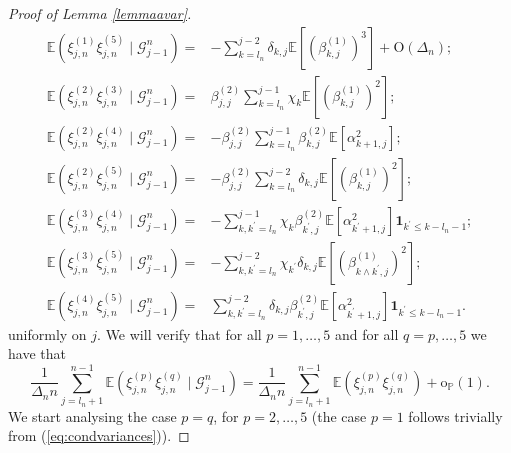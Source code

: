 \documentclass[10pt,a4paper]{amsart}
\begin{document}
\begin{proof}[Proof of Lemma \ref{lemmaavar}]
\begin{equation}
\begin{aligned}
			\mathbb{E}(\xi_{j,n}^{(1)}\xi_{j,n}^{(5)}\mid\mathscr{G}_{j-1}^{n})= &-\sum_{k=l_{n}}^{j-2}\delta_{k,j}\mathbb{E}[(\beta_{k,j}^{(1)})^{3}] +\mathrm{O}(\Delta_n);\\
			\mathbb{E}(\xi_{j,n}^{(2)}\xi_{j,n}^{(3)}\mid\mathscr{G}_{j-1}^{n})= & \beta_{j,j}^{(2)}\sum_{k=l_{n}}^{j-1}\chi_{k}\mathbb{E}[(\beta_{k,j}^{(1)})^{2}];\\
			\mathbb{E}(\xi_{j,n}^{(2)}\xi_{j,n}^{(4)}\mid\mathscr{G}_{j-1}^{n})= & -\beta_{j,j}^{(2)}\sum_{k=l_{n}}^{j-1}\beta_{k,j}^{(2)}\mathbb{E}[\alpha_{k+1,j}^{2}];\\
			\mathbb{E}(\xi_{j,n}^{(2)}\xi_{j,n}^{(5)}\mid\mathscr{G}_{j-1}^{n})= & -\beta_{j,j}^{(2)}\sum_{k=l_{n}}^{j-2}\delta_{k,j}\mathbb{E}[(\beta_{k,j}^{(1)})^{2}];\\
			\mathbb{E}(\xi_{j,n}^{(3)}\xi_{j,n}^{(4)}\mid\mathscr{G}_{j-1}^{n})= & -\sum_{k,k^{\prime}=l_{n}}^{j-1}\chi_{k}\beta_{k^{\prime},j}^{(2)}\mathbb{E}[\alpha_{k^{\prime}+1,j}^{2}]\mathbf{1}_{k^{\prime}\leq k-l_{n}-1};\\
			\mathbb{E}(\xi_{j,n}^{(3)}\xi_{j,n}^{(5)}\mid\mathscr{G}_{j-1}^{n})= & -\sum_{k,k^{\prime}=l_{n}}^{j-2}\chi_{k^{\prime}}\delta_{k,j}\mathbb{E}[(\beta_{k\land k^{\prime},j}^{(1)})^{2}];\\
			\mathbb{E}(\xi_{j,n}^{(4)}\xi_{j,n}^{(5)}\mid\mathscr{G}_{j-1}^{n})= & \sum_{k,k^{\prime}=l_{n}}^{j-2}\delta_{k,j}\beta_{k^{\prime},j}^{(2)}\mathbb{E}[\alpha_{k^{\prime}+1,j}^{2}]\mathbf{1}_{k^{\prime}\leq k-l_{n}-1}.
		\end{aligned}
		\label{eq:condcovar}
	\end{equation}
	uniformly on $j$. We will verify that for all $p=1,\ldots,5$ and for all $q=p,\ldots,5$
	we have that 
	\begin{equation}
		\frac{1}{\Delta_{n}n}\sum_{j=l_{n}+1}^{n-1}\mathbb{E}(\xi_{j,n}^{(p)}\xi_{j,n}^{(q)}\mid\mathscr{G}_{j-1}^{n})=\frac{1}{\Delta_{n}n}\sum_{j=l_{n}+1}^{n-1}\mathbb{E}(\xi_{j,n}^{(p)}\xi_{j,n}^{(q)})+\mathrm{o}_{\mathbb{P}}(1).\label{eq:lemmaapproxxi}
	\end{equation}
	We start analysing the case $p=q$, for $p=2,\ldots,5$ (the case
	$p=1$ follows trivially from (\ref{eq:condvariances})).
	

\end{proof}
\end{document}
